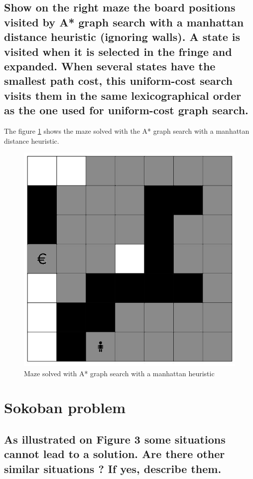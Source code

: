 \documentclass{article}
\begin{document}
\subsection*{Show on the right maze the board positions visited by A* graph search with a manhattan distance heuristic (ignoring walls). A state is visited when it is selected in the fringe and expanded. When several states have the smallest path cost, this uniform-cost search visits them in the same lexicographical order as the one used for uniform-cost graph search.}

The figure \ref{fig:manhattan} shows the maze solved with the  A* graph search with a manhattan distance heuristic.

\begin{figure}[!ht] %
 \centering
 \includegraphics[scale=0.4]{manhattan.JPG} 
 \caption{Maze solved with A* graph search with a manhattan heuristic}
 \label{fig:manhattan}
\end{figure}

\newpage
\section{Sokoban problem}
\subsection*{As illustrated on Figure 3 some situations cannot lead to a solution. Are there other similar situations ? If yes, describe them.}
\end{document}
